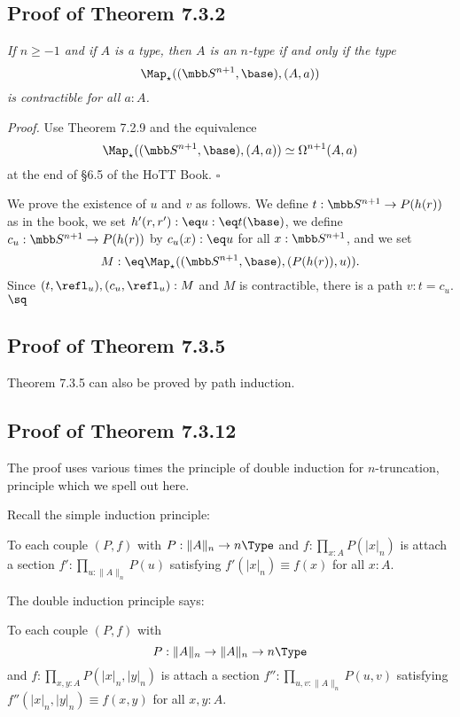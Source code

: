 \documentclass[12pt]{article}
\begin{document}
\subsection{Proof of Theorem 7.3.2}

 \emph{If $n\ge-1$ and if $A$ is a type, then $A$ is an $n$-type if and only if the type 
$$
\Map_\star((\mbb S^{n+1},\base),(A,a))
$$ 
is contractible for all $a:A$.}

\nn\emph{Proof.} Use Theorem 7.2.9 and the equivalence 
$$
\Map_\star((\mbb S^{n+1},\base),(A,a))\simeq\Omega^{n+1}(A,a)
$$ 
at the end of \S6.5 of the HoTT Book. $\square$

We prove the existence of $u$ and $v$ as follows. We define $t:\mbb S^{n+1}\to P(h(r))$ as in the book, we set $h'(r,r'):\eq u:\eq t(\base)$, we define $c_u:\mbb S^{n+1}\to P(h(r))$ by $c_u(x):\eq u$ for all $x:\mbb S^{n+1}$, and we set
$$
M:\eq\Map_\star((\mbb S^{n+1},\base),(P(h(r)),u)).
$$ 
Since $(t,\refl_u),(c_u,\refl_u):M$ and $M$ is contractible, there is a path $v:t=c_u$. $\sq$


\subsection{Proof of Theorem 7.3.5}

Theorem 7.3.5 can also be proved by path induction.


\subsection{Proof of Theorem 7.3.12}

The proof uses various times the principle of double induction for $n$-truncation, principle which we spell out here.

Recall the simple induction principle:

To each couple $(P,f)$ with $P:\lVert A\rVert_n\to n\Type$ and $f:\prod_{x:A}P(\lvert x\rvert_n)$ is attach a section $f':\prod_{u:\lVert A\rVert_n}P(u)$ satisfying $f'(\lvert x\rvert_n)\equiv f(x)$ for all $x:A$.

The double induction principle says:

To each couple $(P,f)$ with $$P:\lVert A\rVert_n\to\lVert A\rVert_n\to n\Type$$ and $f:\prod_{x,y:A}P(\lvert x\rvert_n,\lvert y\rvert_n)$ is attach a section $f'':\prod_{u,v:\lVert A\rVert_n}P(u,v)$ satisfying $f''(\lvert x\rvert_n,\lvert y\rvert_n)\equiv f(x,y)$ for all $x,y:A$.
\end{document}
